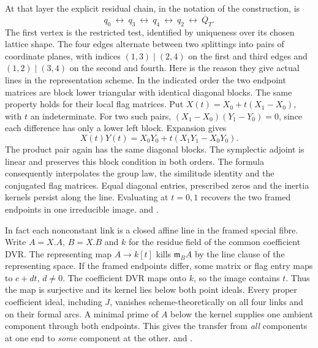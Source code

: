At that layer the explicit residual chain, in the notation of the
construction, is
\[
 q_0\ \longleftrightarrow\ q_3\ \longleftrightarrow\ q_4\
 \longleftrightarrow\ q_2\ \longleftrightarrow\ \overline Q_T .
\]
The first vertex is the restricted test, identified by uniqueness
over its chosen lattice shape. The four edges alternate between
two splittings into pairs of coordinate planes, with indices
\((1,3)\mid(2,4)\) on the first and third edges and
\((1,2)\mid(3,4)\) on the second and fourth. Here is the
reason they give actual lines in the representation scheme.
In the indicated order the two endpoint matrices are block lower
triangular with identical diagonal blocks. The same property
holds for their local flag matrices. Put
\(X(t)=X_0+t(X_1-X_0)\), with \(t\) an indeterminate. For two
such pairs, \((X_1-X_0)(Y_1-Y_0)=0\), since each difference has
only a lower left block. Expansion gives
\[
 X(t)Y(t)=X_0Y_0+t(X_1Y_1-X_0Y_0).
\]
The product pair again has the same diagonal blocks. The
symplectic adjoint is linear and preserves this block condition
in both orders. The formula consequently interpolates the group
law, the similitude identity and the conjugated flag matrices.
Equal diagonal entries, prescribed zeros and the inertia kernels
persist along the line. Evaluating at \(t=0,1\) recovers the
two framed endpoints in one irreducible image.
and .

In fact each nonconstant link is a closed affine line in the framed
special fibre. Write \(A=X.A\), \(B=X.B\) and \(k\) for the
residue field of the common coefficient DVR. The representing map
\(A\to k[t]\) kills \(\mathfrak m_B A\) by the line clause of
the representing space. If the framed endpoints differ, some
matrix or flag entry maps to \(c+dt\), \(d\ne0\). The coefficient
DVR maps onto \(k\), so the image contains \(t\). Thus the map is
surjective and its kernel lies below both point ideals. Every proper
coefficient ideal, including \(J\), vanishes scheme-theoretically
on all four links and on their formal arcs. A minimal prime of
\(A\) below the kernel supplies one ambient component through both
endpoints. This gives the transfer from \emph{all} components at
one end to \emph{some} component at the other.
and .

